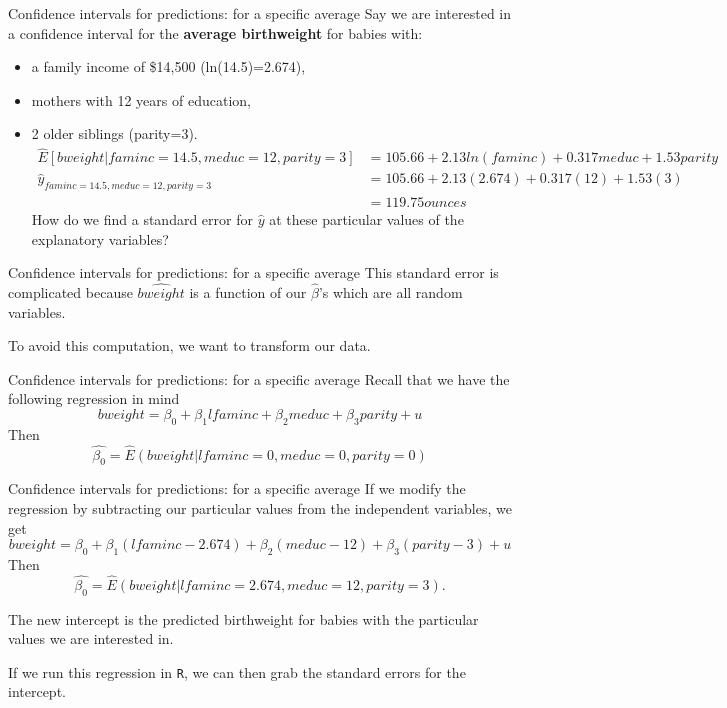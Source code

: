 \documentclass[
  ignorenonframetext,
]{beamer}
\begin{document}
\begin{frame}{Confidence intervals for predictions: for a specific
average}
\protect\hypertarget{confidence-intervals-for-predictions-for-a-specific-average-1}{}
Say we are interested in a confidence interval for the \textbf{average
birthweight} for babies with:

\begin{itemize}
\item
  a family income of \$14,500 (ln(14.5)=2.674),
\item
  mothers with 12 years of education,
\item
  2 older siblings (parity=3). \tiny \[
  \begin{aligned}
  \hat{E}[bweight|faminc=14.5, meduc=12, parity=3]&=105.66+2.13ln(faminc)+0.317meduc+1.53parity\\
  \hat{y}_{faminc=14.5, meduc=12, parity=3} &= 105.66+2.13 (2.674)+0.317(12)+1.53(3)\\
  &= 119.75 ounces
  \end{aligned}
  \] \normalsize How do we find a standard error for \(\hat{y}\) at
  these particular values of the explanatory variables?
\end{itemize}
\end{frame}

\begin{frame}{Confidence intervals for predictions: for a specific
average}
\protect\hypertarget{confidence-intervals-for-predictions-for-a-specific-average-2}{}
This standard error is complicated because \(\widehat{bweight}\) is a
function of our \(\hat{\beta}\)'s which are all random variables.

To avoid this computation, we want to transform our data.
\end{frame}

\begin{frame}{Confidence intervals for predictions: for a specific
average}
\protect\hypertarget{confidence-intervals-for-predictions-for-a-specific-average-3}{}
Recall that we have the following regression in mind \[
bweight=\beta_0+\beta_1lfaminc+\beta_2 meduc+\beta_3 parity+u
\] Then \[
\hat{\beta_0}=\hat{E}(bweight|lfaminc=0, meduc=0, parity=0)
\]
\end{frame}

\begin{frame}[fragile]{Confidence intervals for predictions: for a
specific average}
\protect\hypertarget{confidence-intervals-for-predictions-for-a-specific-average-4}{}
If we modify the regression by subtracting our particular values from
the independent variables, we get \[
bweight=\beta_0+\beta_1(lfaminc-2.674)+\beta_2(meduc-12)+\beta_3(parity-3)+u
\] Then \[
\hat{\beta_0}=\hat{E}(bweight|lfaminc=2.674, meduc=12, parity=3).
\]

The new intercept is the predicted birthweight for babies with the
particular values we are interested in.

If we run this regression in \texttt{R}, we can then grab the standard
errors for the intercept.
\end{frame}
\end{document}
